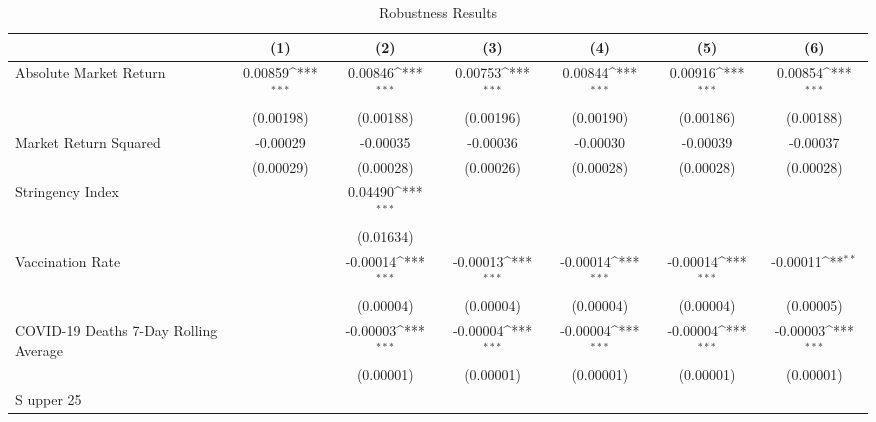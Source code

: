 \begin{table}[htbp]\centering
\def\sym#1{\ifmmode^{#1}\else\(^{#1}\)\fi}
\caption{Robustness Results \label{reg2}}
\begin{tabular}{l*{6}{c}}
\toprule
                    &\multicolumn{1}{c}{(1)}         &\multicolumn{1}{c}{(2)}         &\multicolumn{1}{c}{(3)}         &\multicolumn{1}{c}{(4)}         &\multicolumn{1}{c}{(5)}         &\multicolumn{1}{c}{(6)}         \\
\midrule
Absolute Market Return&     0.00859\sym{***}&     0.00846\sym{***}&     0.00753\sym{***}&     0.00844\sym{***}&     0.00916\sym{***}&     0.00854\sym{***}\\
                    &   (0.00198)         &   (0.00188)         &   (0.00196)         &   (0.00190)         &   (0.00186)         &   (0.00188)         \\
\addlinespace
Market Return Squared&    -0.00029         &    -0.00035         &    -0.00036         &    -0.00030         &    -0.00039         &    -0.00037         \\
                    &   (0.00029)         &   (0.00028)         &   (0.00026)         &   (0.00028)         &   (0.00028)         &   (0.00028)         \\
\addlinespace
Stringency Index    &                     &     0.04490\sym{***}&                     &                     &                     &                     \\
                    &                     &   (0.01634)         &                     &                     &                     &                     \\
\addlinespace
Vaccination Rate    &                     &    -0.00014\sym{***}&    -0.00013\sym{***}&    -0.00014\sym{***}&    -0.00014\sym{***}&    -0.00011\sym{**} \\
                    &                     &   (0.00004)         &   (0.00004)         &   (0.00004)         &   (0.00004)         &   (0.00005)         \\
\addlinespace
COVID-19 Deaths 7-Day Rolling Average&                     &    -0.00003\sym{***}&    -0.00004\sym{***}&    -0.00004\sym{***}&    -0.00004\sym{***}&    -0.00003\sym{***}\\
                    &                     &   (0.00001)         &   (0.00001)         &   (0.00001)         &   (0.00001)         &   (0.00001)         \\
\addlinespace
S upper 25%

\end{tabular}
\end{table}
